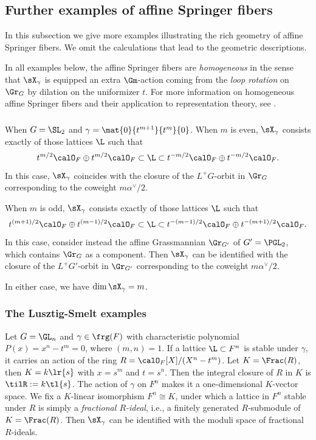 \subsection{Further examples of affine Springer fibers}\label{ss:aff examples}
In this subsection we give more examples illustrating the rich geometry of affine Springer fibers. We omit the calculations that lead to the geometric descriptions. 

In all examples below, the affine Springer fibers are {\em homogeneous} in the sense that $\sX_{\gamma}$ is equipped an extra $\Gm$-action coming from the {\em loop rotation} on $\Gr_{G}$ by dilation on the uniformizer $t$. For more information on homogeneous affine Springer fibers and their application to representation theory, see \cite{OY}. 


\subsubsection{}\label{SL2 ram} When $G=\SL_{2}$ and $\gamma=\mat{0}{t^{m+1}}{t^{m}}{0}$.  When $m$ is even, $\sX_{\gamma}$ consists exactly of those lattices $\L$ such that
\begin{equation*}
t^{m/2}\calO_{F}\oplus t^{m/2}\calO_{F}\subset\L\subset t^{-m/2}\calO_{F}\oplus t^{-m/2}\calO_{F}.\end{equation*}
In this case, $\sX_{\gamma}$ coincides with the closure of the $L^{+}G$-orbit in $\Gr_{G}$ corresponding to the coweight $m\alpha^{\vee}/2$. 

When $m$ is odd, $\sX_{\gamma}$ consists exactly of those lattices $\L$ such that
\begin{equation*}
t^{(m+1)/2}\calO_{F}\oplus t^{(m-1)/2}\calO_{F}\subset\L\subset t^{-(m-1)/2}\calO_{F}\oplus t^{-(m+1)/2}\calO_{F}.
\end{equation*}
In this case, consider instead the affine Grassmannian $\Gr_{G'}$ of $G'=\PGL_{2}$, which contains $\Gr_{G}$ as a component. Then $\sX_{\gamma}$ can be identified with the closure of the $L^{+}G'$-orbit in $\Gr_{G'}$ corresponding to the coweight $m\alpha^{\vee}/2$. 

In either case, we have $\dim\sX_{\gamma}=m$.



\subsubsection{The Lusztig-Smelt examples}\label{sss:LS} Let $G=\GL_{n}$ and $\gamma\in\frg(F)$ with characteristic polynomial $P(x)=x^{n}-t^{m}=0$, where $(m,n)=1$. If a lattice $\L\subset F^{n}$ is stable under $\gamma$, it carries an action of the ring $R=\calO_{F}[X]/(X^{n}-t^{m})$. Let $K=\Frac(R)$, then $K= k\lr{s}$ with $x=s^{m}$ and $t=s^{n}$. Then the integral closure of $R$ in $K$ is $\tilR:=k\tl{s}$. The action of $\gamma$ on $F^{n}$ makes it a one-dimensional $K$-vector space. We fix a $K$-linear isomorphism $F^{n}\cong K$, under which a lattice in $F^{n}$ stable under $R$ is simply a {\em fractional $R$-ideal}, i.e., a finitely generated $R$-submodule of $K=\Frac(R)$.  Then $\sX_{\gamma}$ can be identified with the moduli space of fractional $R$-ideals.

